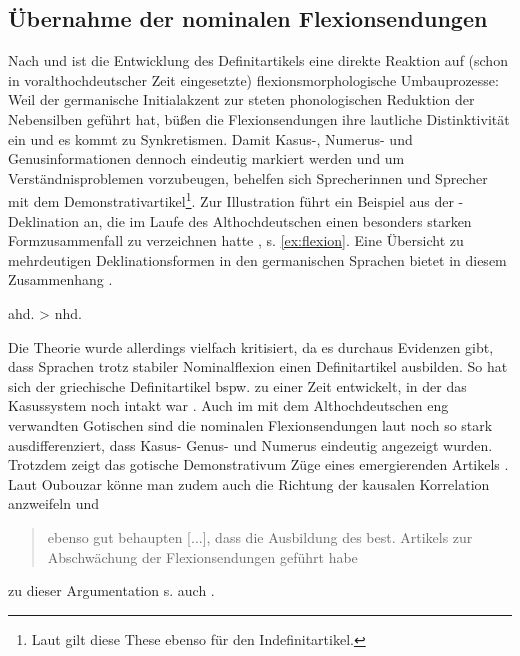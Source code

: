 \subsection{Übernahme der nominalen Flexionsendungen} \label{sec:flexion} 

Nach \textcite[168-170]{Tschirch1983} und \textcite[13]{vonPolenz2009} ist die Entwicklung des Definitartikels eine direkte Reaktion auf (schon in voralthochdeutscher Zeit eingesetzte) flexionsmorphologische Umbauprozesse: Weil der germanische Initialakzent zur steten phonologischen Reduktion der Nebensilben geführt hat, büßen die Flexionsendungen ihre lautliche Distinktivität ein und es kommt zu Synkretismen. Damit Kasus-, Numerus- und Genusinformationen dennoch eindeutig markiert werden und um Verständnisproblemen vorzubeugen, behelfen sich Sprecherinnen und Sprecher mit dem Demonstrativartikel\footnote{Laut \textcite[70]{Schildt1981} gilt diese These ebenso für den Indefinitartikel.}. Zur Illustration führt \textcite[13]{vonPolenz2009} ein Beispiel aus der -Deklination an, die im Laufe des Althochdeutschen einen besonders starken Formzusammenfall zu verzeichnen hatte \parencite[248]{Meineke2001}, s. \ref{ex:flexion}. Eine Übersicht zu mehrdeutigen Deklinationsformen in den germanischen Sprachen bietet in diesem Zusammenhang \textcite[48-51]{Heinrichs1954}. 
 
\begin{exe}
	\ex \label{ex:flexion}   
	ahd.  > nhd. 
\end{exe}

Die Theorie wurde allerdings vielfach kritisiert, da es durchaus Evidenzen gibt, dass Sprachen trotz stabiler Nominalflexion einen Definitartikel ausbilden. So hat sich der griechische Definitartikel bspw. zu einer Zeit entwickelt, in der das Kasussystem noch intakt war \parencite[44]{Ebert1978}. 
Auch im mit dem Althochdeutschen eng verwandten Gotischen sind die nominalen Flexionsendungen laut \textcite[10]{Kovari1984} noch so stark ausdifferenziert, dass Kasus- Genus- und Numerus eindeutig angezeigt wurden. Trotzdem zeigt das gotische Demonstrativum Züge eines emergierenden Artikels \parencite[vgl.][114-155]{Leiss2000}. Laut Oubouzar könne man zudem auch die Richtung der kausalen Korrelation anzweifeln und \blockcquote[71]{Oubouzar1992}{ebenso gut behaupten
[...], dass die Ausbildung des best. Artikels zur Abschwächung der Flexionsendungen geführt habe}; zu dieser Argumentation s. auch \textcite[51]{Heinrichs1954}.  


